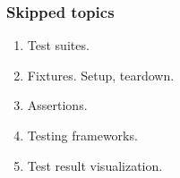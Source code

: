 \begin{frame}
	\frametitle{Skipped topics}
	\begin{enumerate}[<+-| highlight@+>]
		\item Test suites.
		\item Fixtures. Setup, teardown.
		\item Assertions.
		\item Testing frameworks.
		\item Test result visualization.
	\end{enumerate}
\end{frame}

